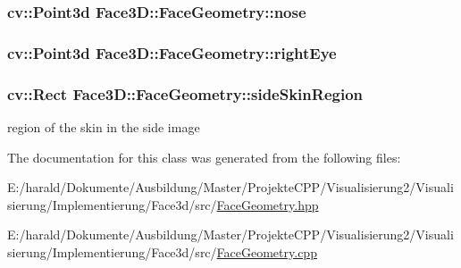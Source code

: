 \subsubsection[{\texorpdfstring{nose}{nose}}]{\setlength{\rightskip}{0pt plus 5cm}cv\+::\+Point3d Face3\+D\+::\+Face\+Geometry\+::nose\hspace{0.3cm}{\ttfamily [private]}}\hypertarget{class_face3_d_1_1_face_geometry_a51b5cf29a6deac13aad7ab3ba3858eca}{}\label{class_face3_d_1_1_face_geometry_a51b5cf29a6deac13aad7ab3ba3858eca}
\subsubsection[{\texorpdfstring{right\+Eye}{rightEye}}]{\setlength{\rightskip}{0pt plus 5cm}cv\+::\+Point3d Face3\+D\+::\+Face\+Geometry\+::right\+Eye\hspace{0.3cm}{\ttfamily [private]}}\hypertarget{class_face3_d_1_1_face_geometry_a2843e84aaa697a4cd418d1940378955b}{}\label{class_face3_d_1_1_face_geometry_a2843e84aaa697a4cd418d1940378955b}
\subsubsection[{\texorpdfstring{side\+Skin\+Region}{sideSkinRegion}}]{\setlength{\rightskip}{0pt plus 5cm}cv\+::\+Rect Face3\+D\+::\+Face\+Geometry\+::side\+Skin\+Region\hspace{0.3cm}{\ttfamily [private]}}\hypertarget{class_face3_d_1_1_face_geometry_a50fd03eb7de07088b36d3e4dea286b94}{}\label{class_face3_d_1_1_face_geometry_a50fd03eb7de07088b36d3e4dea286b94}


region of the skin in the side image 



The documentation for this class was generated from the following files\+:\begin{DoxyCompactItemize}
\item 
E\+:/harald/\+Dokumente/\+Ausbildung/\+Master/\+Projekte\+C\+P\+P/\+Visualisierung2/\+Visualisierung/\+Implementierung/\+Face3d/src/\hyperlink{_face_geometry_8hpp}{Face\+Geometry.\+hpp}\item 
E\+:/harald/\+Dokumente/\+Ausbildung/\+Master/\+Projekte\+C\+P\+P/\+Visualisierung2/\+Visualisierung/\+Implementierung/\+Face3d/src/\hyperlink{_face_geometry_8cpp}{Face\+Geometry.\+cpp}\end{DoxyCompactItemize}
